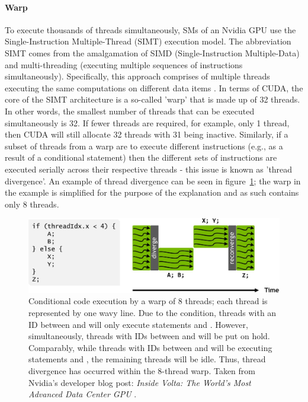 \paragraph{Warp}
To execute thousands of threads simultaneously, SMs of an Nvidia GPU use the Single-Instruction Multiple-Thread (SIMT) execution model. The abbreviation SIMT comes from the amalgamation of SIMD (Single-Instruction Multiple-Data) and multi-threading (executing multiple sequences of instructions simultaneously). Specifically, this approach comprises of multiple threads executing the same computations on different data items \cite{Marziale2010}. In terms of CUDA, the core of the SIMT architecture is a so-called 'warp' that is made up of 32 threads. In other words, the smallest number of threads that can be executed simultaneously is 32. If fewer threads are required, for example, only 1 thread, then CUDA will still allocate 32 threads with 31 being inactive. Similarly, if a subset of threads from a warp are to execute different instructions (e.g., as a result of a conditional statement) then the different sets of instructions are executed serially across their respective threads - this issue is known as 'thread divergence'. An example of thread divergence can be seen in figure~\ref{Figure:CUDA-warp-thread-divergence}; the warp in the example is simplified for the purpose of the explanation and as such contains only 8 threads.

\begin{figure}[h!]
	\centering
	\includegraphics[width=14cm, keepaspectratio]{images/ch1/CUDA_warp_divergence_execution_path.jpg}
	\caption{Conditional code execution by a warp of 8 threads; each thread is represented by one wavy line. Due to the condition, threads with an ID between  and  will only execute statements  and . However, simultaneously, threads with IDs between  and  will be put on hold. Comparably, while threads with IDs between  and  will be executing statements  and , the remaining threads will be idle. Thus, thread divergence has occurred within the 8-thread warp. Taken from Nvidia's developer blog post: \emph{Inside Volta: The World's Most Advanced Data Center GPU} \cite{Durant10May2017}.}
	\label{Figure:CUDA-warp-thread-divergence}
\end{figure}

